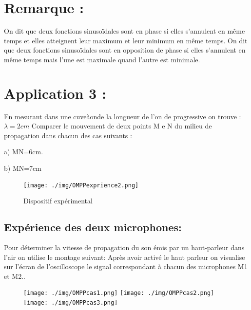 \documentclass[12pt]{article}
\begin{document}
\section*{Remarque :}
\begin{tcolorbox}
	On dit que deux fonctions sinusoïdales sont en phase si elles s'annulent en même temps et elles atteignent leur
maximum et leur minimum en même temps.
\tcblower
On dit que deux fonctions sinusoïdales sont en opposition de phase si elles s'annulent en même temps mais l'une est maximale
quand l'autre est minimale.
\end{tcolorbox}

\section*{Application 3 : }


En mesurant dans une cuveàonde la longueur de l'on de progressive on trouve : $\lambda = 2cm$ Comparer le mouvement de deux points M e N du milieu de propagation dans chacun des cas suivants :

a) MN=6cm.

b) MN=7cm

\begin{figure}
	\vspace{-1cm}
	\texttt{[image: ./img/OMPPexprience2.png]}
	\caption{Dispositif expérimental}
\end{figure}


\subsection{Expérience des deux microphones: }

Pour déterminer la vitesse de propagation du son émis par un haut-parleur dans l'air on utilise le montage suivant: Après avoir activé le haut parleur on visualise sur l'écran de l'oscilloscope le signal correspondant à chacun des microphones M1 et M2..

\begin{figure}[h]
\vspace{-0.5cm}
	\texttt{[image: ./img/OMPPcas1.png]}
	\texttt{[image: ./img/OMPPcas2.png]}
	\texttt{[image: ./img/OMPPcas3.png]}
\vspace{-0.9cm}
\end{figure}
\end{document}
